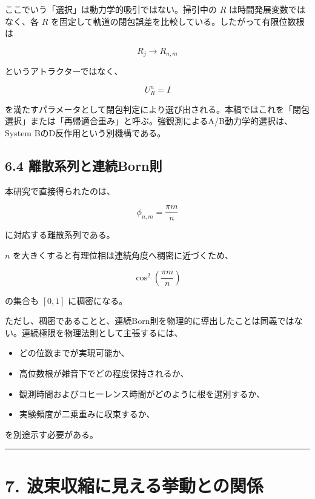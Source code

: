 \documentclass[
  a4paper,
  10pt]{article}
\providecommand{\tightlist}{%
  \setlength{\itemsep}{0pt}\setlength{\parskip}{0pt}}
\begin{document}
ここでいう「選択」は動力学的吸引ではない。掃引中の \(R\)
は時間発展変数ではなく、各 \(R\)
を固定して軌道の閉包誤差を比較している。したがって有限位数根は

\[
R_j\longrightarrow R_{n,m}
\]

というアトラクターではなく、

\[
U_R^n=I
\]

を満たすパラメータとして閉包判定により選び出される。本稿ではこれを「閉包選択」または「再帰適合重み」と呼ぶ。強観測によるA/B動力学的選択は、System
BのD反作用という別機構である。

\subsection{6.4
離散系列と連続Born則}\label{64-ux96e2ux6563ux7cfbux5217ux3068ux9023ux7d9abornux5247}

本研究で直接得られたのは、

\[
\phi_{n,m}=\frac{\pi m}{n}
\]

に対応する離散系列である。

\(n\) を大きくすると有理位相は連続角度へ稠密に近づくため、

\[
\cos^2\left(\frac{\pi m}{n}\right)
\]

の集合も \([0,1]\) に稠密になる。

ただし、稠密であることと、連続Born則を物理的に導出したことは同義ではない。連続極限を物理法則として主張するには、

\begin{itemize}
\tightlist
\item
  どの位数までが実現可能か、
\item
  高位数根が雑音下でどの程度保持されるか、
\item
  観測時間およびコヒーレンス時間がどのように根を選別するか、
\item
  実験頻度が二乗重みに収束するか、
\end{itemize}

を別途示す必要がある。

\begin{center}\rule{0.5\linewidth}{0.5pt}\end{center}

\section{7.
波束収縮に見える挙動との関係}\label{7-ux6ce2ux675fux53ceux7e2eux306bux898bux3048ux308bux6319ux52d5ux3068ux306eux95a2ux4fc2}
\end{document}
